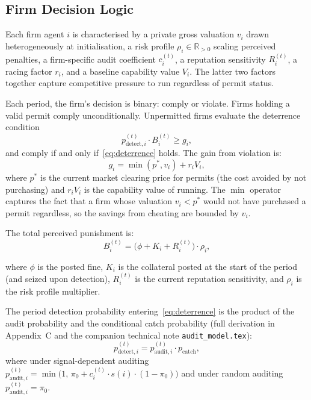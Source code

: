 \subsection{Firm Decision Logic}

Each firm agent $i$ is characterised by a private gross valuation $v_i$ drawn heterogeneously at initialisation, a risk profile $\rho_i \in \mathbb{R}_{>0}$ scaling perceived penalties, a firm-specific audit coefficient $c_i^{(t)}$, a reputation sensitivity $R_i^{(t)}$, a racing factor $r_i$, and a baseline capability value $V_i$. The latter two factors together capture competitive pressure to run regardless of permit status.

Each period, the firm's decision is binary: comply or violate. Firms holding a valid permit comply unconditionally. Unpermitted firms evaluate the deterrence condition
%
\begin{equation}
    p_{\mathrm{detect},i}^{(t)} \cdot B_i^{(t)} \geq g_i,
    \label{eq:deterrence}
\end{equation}
%
and comply if and only if~\eqref{eq:deterrence} holds. The gain from violation is:
%
\begin{equation}
    g_i = \min(p^*, v_i) + r_i V_i,
\end{equation}
%
where $p^*$ is the current market clearing price for permits (the cost avoided by not purchasing) and $r_i V_i$ is the capability value of running. The $\min$ operator captures the fact that a firm whose
valuation $v_i < p^*$ would not have purchased a permit regardless, so the savings from cheating are bounded by $v_i$.

The total perceived punishment is:
%
\begin{equation}
    B_i^{(t)} = \bigl(\phi + K_i + R_i^{(t)}\bigr) \cdot \rho_i,
\end{equation}
%

where $\phi$ is the posted fine, $K_i$ is the collateral posted at the start of the period (and seized upon detection), $R_i^{(t)}$ is the current reputation sensitivity, and $\rho_i$ is the risk profile multiplier.

The period detection probability entering~\eqref{eq:deterrence} is the product of the audit probability and the conditional catch probability (full derivation in Appendix~C and the companion technical note \texttt{audit\_model.tex}):
%
\begin{equation}
    p_{\mathrm{detect},i}^{(t)} = p_{\mathrm{audit},i}^{(t)} \cdot p_{\mathrm{catch}},
\end{equation}
%
where under signal-dependent auditing $p_{\mathrm{audit},i}^{(t)} = \min\!\bigl(1,\, \pi_0 + c_i^{(t)} \cdot s(i) \cdot (1 - \pi_0)\bigr)$
and under random auditing $p_{\mathrm{audit},i}^{(t)} = \pi_0$.

